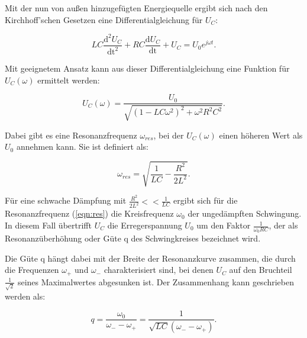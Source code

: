 \noindent
Mit der nun von außen hinzugefügten Energiequelle ergibt sich nach den Kirchhoff'schen Gesetzen eine Differentialgleichung für $U_C$:

\begin{equation}
LC \frac{\text{d}^2 U_C}{\text{dt}^2} + RC \frac{\text{d} U_C}{\text{dt}} + U_C = U_0 e^{j \omega t}.
\end{equation}

\noindent
Mit geeignetem Ansatz kann aus dieser Differentialgleichung eine Funktion für $U_C(\omega)$ ermittelt werden:

\begin{equation}
U_C(\omega) = \frac{U_0}{\sqrt{(1-LC\omega^2)^2 + \omega^2 R^2 C^2}}.
\label{eqn:uc}
\end{equation}

\noindent
Dabei gibt es eine Resonanzfrequenz $\omega_{res}$, bei der $U_C(\omega)$ einen höheren Wert als $U_0$ annehmen kann.
Sie ist definiert als:

\begin{equation}
\omega_{res} = \sqrt{\frac{1}{LC} - \frac{R^2}{2L^2}}.
\label{eqn:res}
\end{equation}

\noindent
Für eine schwache Dämpfung mit $\frac{R^2}{2L^2} << \frac{1}{LC}$ ergibt sich für die Resonanzfrequenz (\ref{eqn:res}) die Kreisfrequenz $\omega_0$ der ungedämpften Schwingung.
In diesem Fall übertrifft $U_C$ die Erregerspannung $U_0$ um den Faktor $\frac{1}{\omega_0 RC}$, 
der als Resonanzüberhöhung oder Güte q des Schwingkreises bezeichnet wird.

\noindent
Die Güte q hängt dabei mit der Breite der Resonanzkurve zusammen, 
die durch die Frequenzen $\omega_+$ und $\omega_-$ charakterisiert sind,
bei denen $U_C$ auf den Bruchteil $\frac{1}{\sqrt{2}}$ seines Maximalwertes abgesunken ist.
Der Zusammenhang kann geschrieben werden als:

\begin{equation}
q = \frac{\omega_0}{\omega_- - \omega_+}= \frac{1}{\sqrt{LC}(\omega_- - \omega_+)}.
\label{eqn:guete}
\end{equation}

 


